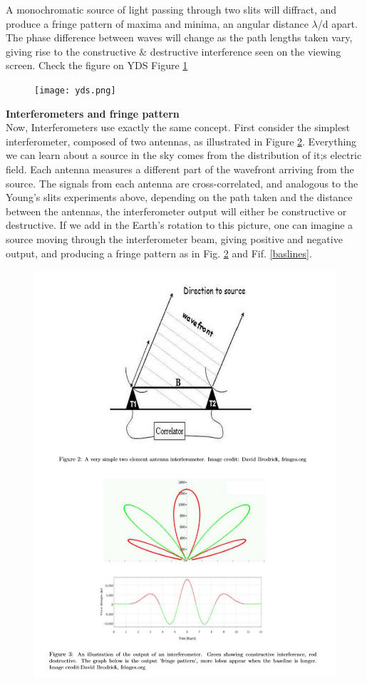 \documentclass[10pt]{report}
\newcommand{\tbf}[1]{\textbf{#1}}
\begin{document}
A monochromatic source of light passing through two slits will diffract, and produce a fringe pattern of maxima and minima, an angular distance $\lambda$/d apart. The phase difference between waves will change as the path lengths taken vary, giving rise to the constructive $\&$ destructive interference seen on the viewing screen. Check the figure on YDS Figure \ref{yds}
\begin{figure}\label{yds}
\texttt{[image: yds.png]}
\end{figure}

\tbf{Interferometers and fringe pattern}\\

Now, Interferometers use exactly the same concept. First consider the simplest interferometer, composed of two antennas, as illustrated in Figure \ref{ap}. Everything we can learn about a source in the sky comes from the distribution of it;s electric field. Each antenna measures a different part of the wavefront arriving from the source. The signals from each antenna are cross-correlated, and analogous to the Young's slits experiments above, depending on the path taken and the distance between the antennas, the interferometer output will either be constructive or destructive. If we add in the Earth's rotation to this picture, one can imagine a source moving through the interferometer beam, giving positive and negative output, and producing a fringe pattern as in Fig. \ref{ap} and Fif. \ref{baslines}.
\begin{figure}\label{ap}
\includegraphics[scale=1]{antennapattern.png}
\end{figure}
\end{document}
